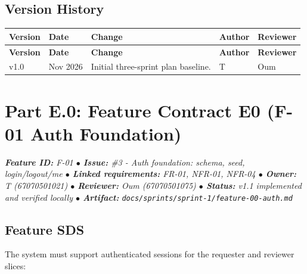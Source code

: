 \documentclass[11pt,a4paper]{article}
\begin{document}
\subsection{Version History}

\vspace{0.3em}
\begin{longtable}{|>{\centering\arraybackslash}p{1.2cm}|>{\centering\arraybackslash}p{1.8cm}|>{\RaggedRight}p{6.6cm}|>{\RaggedRight}p{3.2cm}|>{\centering\arraybackslash}p{1.6cm}|}
\hline
\rowcolor{zenPale}\textbf{Version} & \textbf{Date} & \textbf{Change} & \textbf{Author} & \textbf{Reviewer} \\ \hline
\endfirsthead
\hline
\rowcolor{zenPale}\textbf{Version} & \textbf{Date} & \textbf{Change} & \textbf{Author} & \textbf{Reviewer} \\ \hline
\endhead
\hline
\endfoot
v1.0 & 6 Nov 2026 & Initial three-sprint plan baseline. & T & Oum \\ \hline
\end{longtable}
\vspace{0.3em}
\newpage
\section{Part E.0: Feature Contract E0 (F-01 Auth Foundation)}\label{sec:part-e0}

\begin{tcolorbox}[colback=lightbg,colframe=secondary,arc=2mm,boxrule=0.8pt]\small\itshape
\textbf{Feature ID:} F-01 \quad $\bullet$ \quad \textbf{Issue:} \#3 - Auth foundation: schema, seed, login/logout/me \quad $\bullet$ \quad \textbf{Linked requirements:} FR-01, NFR-01, NFR-04 \quad $\bullet$ \quad \textbf{Owner:} T (67070501021) \quad $\bullet$ \quad \textbf{Reviewer:} Oum (67070501075) \quad $\bullet$ \quad \textbf{Status:} v1.1 implemented and verified locally \quad $\bullet$ \quad \textbf{Artifact:} \texttt{docs/sprints/sprint-1/feature-00-auth.md}
\end{tcolorbox}


\subsection{Feature SDS}

The system must support authenticated sessions for the requester and reviewer\\
slices:\\
\end{document}

